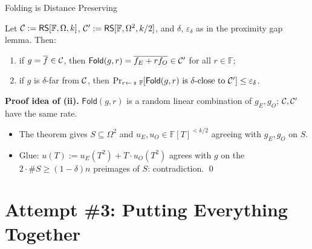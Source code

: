 \documentclass{zkdl-presentation-template}
\begin{document}
    \begin{frame}{Folding is Distance Preserving}
        \begin{lemma}
            Let $\mathcal{C} := \mathsf{RS}[\mathbb{F},\Omega,k]$, $\mathcal{C}' := \mathsf{RS}[\mathbb{F},\Omega^2,k/2]$, and $\delta$, $\varepsilon_\delta$ as in the proximity gap lemma. Then:
            \begin{enumerate}
                \item if $g = \overline{f} \in \mathcal{C}$, then $\mathsf{Fold}(g, r) = \overline{f_E + r f_O} \in \mathcal{C}'$ for all $r \in \mathbb{F}$;
                \item if $g$ is $\delta$-far from $\mathcal{C}$, then $\Pr_{r \leftarrowS \mathbb{F}}[\mathsf{Fold}(g, r) \text{ is } \delta\text{-close to } \code'] \leq \varepsilon_{\delta}$.
            \end{enumerate}
        \end{lemma}
        \pause

        \textbf{Proof idea of (ii).} $\mathsf{Fold}(g, r)$ is a random linear combination of $g_E, g_O$; $\mathcal{C}, \mathcal{C}'$ have the same rate.
        \begin{itemize}
            \item<3-> The theorem gives $S \subseteq \Omega^2$ and $u_E, u_O \in \mathbb{F}[T]^{<k/2}$ agreeing with $g_E, g_O$ on $S$.
            \item<4-> Glue: $u(T) := u_E(T^2) + T \cdot u_O(T^2)$ agrees with $g$ on the $2 \cdot \#S \geq (1-\delta)n$ preimages of $S$: contradiction. \qed
        \end{itemize}
    \end{frame}

    \section{Attempt \#3: Putting Everything Together}
\end{document}
